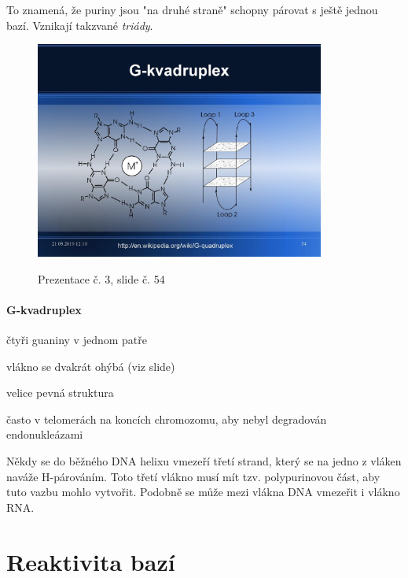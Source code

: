 \documentclass[DIV=8]{scrreprt}
\begin{document}
To znamená, že puriny jsou "na druhé straně" schopny párovat s ještě jednou bazí. Vznikají takzvané \emph{triády}.

\begin{figure}
    \caption{Prezentace č. 3, slide č. 54}
    \includegraphics[width=0.85\textwidth]{slides-3/slide-54.jpg}
    \centering
    \label{slides-3-slide-54}
\end{figure}

\paragraph{G-kvadruplex}
\begin{myItemize}[nosep]
    \item čtyři guaniny v jednom patře
\begin{myItemize}[nosep]
    \item vlákno se dvakrát ohýbá (viz slide)
\end{myItemize}

    \item velice pevná struktura
    \item často v telomerách na koncích chromozomu, aby nebyl degradován endonukleázami
\end{myItemize}



Někdy se do běžného DNA helixu vmezeří třetí strand, který se na jedno z vláken naváže H-párováním. Toto třetí vlákno musí mít tzv. polypurinovou část, aby tuto vazbu mohlo vytvořit. Podobně se může mezi vlákna DNA vmezeřit i vlákno RNA.

\section{Reaktivita bazí} \label{Reaktivita bazí} \FloatBarrier
\end{document}
